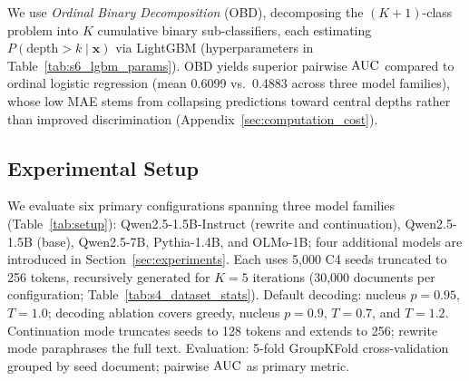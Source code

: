 We use \emph{Ordinal Binary Decomposition} (OBD), decomposing the $(K{+}1)$-class problem into $K$ cumulative binary sub-classifiers, each estimating $P(\text{depth} > k \mid \mathbf{x})$ via LightGBM (hyperparameters in Table~\ref{tab:s6_lgbm_params}).
OBD yields superior pairwise $\text{AUC}$ compared to ordinal logistic regression (mean 0.6099 vs.\ 0.4883 across three model families), whose low MAE stems from collapsing predictions toward central depths rather than improved discrimination (Appendix~\ref{sec:computation_cost}).

\subsection{Experimental Setup}
\label{sec:experimental_setup}

We evaluate six primary configurations spanning three model families (Table~\ref{tab:setup}): Qwen2.5-1.5B-Instruct (rewrite and continuation), Qwen2.5-1.5B (base), Qwen2.5-7B, Pythia-1.4B, and OLMo-1B; four additional models are introduced in Section~\ref{sec:experiments}.
Each uses 5{,}000 C4 seeds truncated to 256 tokens, recursively generated for $K{=}5$ iterations (30{,}000 documents per configuration; Table~\ref{tab:s4_dataset_stats}).
Default decoding: nucleus $p{=}0.95$, $T{=}1.0$; decoding ablation covers greedy, nucleus $p{=}0.9$, $T{=}0.7$, and $T{=}1.2$.
Continuation mode truncates seeds to 128 tokens and extends to 256; rewrite mode paraphrases the full text.
Evaluation: 5-fold GroupKFold cross-validation grouped by seed document; pairwise $\text{AUC}$ as primary metric.
